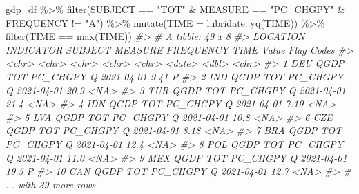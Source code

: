 \documentclass[
]{article}
\newenvironment{Shaded}{\begin{snugshade}}{\end{snugshade}}
\newcommand{\AttributeTok}[1]{\textcolor[rgb]{0.77,0.63,0.00}{#1}}
\newcommand{\CommentTok}[1]{\textcolor[rgb]{0.56,0.35,0.01}{\textit{#1}}}
\newcommand{\FunctionTok}[1]{\textcolor[rgb]{0.00,0.00,0.00}{#1}}
\newcommand{\NormalTok}[1]{#1}
\newcommand{\SpecialCharTok}[1]{\textcolor[rgb]{0.00,0.00,0.00}{#1}}
\newcommand{\StringTok}[1]{\textcolor[rgb]{0.31,0.60,0.02}{#1}}
\begin{document}
\begin{Shaded}
\begin{Highlighting}[]
\NormalTok{gdp\_df }\SpecialCharTok{\%\textgreater{}\%} 
  \FunctionTok{filter}\NormalTok{(SUBJECT }\SpecialCharTok{==} \StringTok{"TOT"} \SpecialCharTok{\&}\NormalTok{ MEASURE }\SpecialCharTok{==} \StringTok{"PC\_CHGPY"} \SpecialCharTok{\&}\NormalTok{ FREQUENCY }\SpecialCharTok{!=} \StringTok{"A"}\NormalTok{) }\SpecialCharTok{\%\textgreater{}\%} 
  \FunctionTok{mutate}\NormalTok{(}\AttributeTok{TIME =}\NormalTok{ lubridate}\SpecialCharTok{::}\FunctionTok{yq}\NormalTok{(TIME)) }\SpecialCharTok{\%\textgreater{}\%} 
  \FunctionTok{filter}\NormalTok{(TIME }\SpecialCharTok{==} \FunctionTok{max}\NormalTok{(TIME)) }
\CommentTok{\#\textgreater{} \# A tibble: 49 x 8}
\CommentTok{\#\textgreater{}    LOCATION INDICATOR SUBJECT MEASURE  FREQUENCY TIME       Value \textasciigrave{}Flag Codes\textasciigrave{}}
\CommentTok{\#\textgreater{}    \textless{}chr\textgreater{}    \textless{}chr\textgreater{}     \textless{}chr\textgreater{}   \textless{}chr\textgreater{}    \textless{}chr\textgreater{}     \textless{}date\textgreater{}     \textless{}dbl\textgreater{} \textless{}chr\textgreater{}       }
\CommentTok{\#\textgreater{}  1 DEU      QGDP      TOT     PC\_CHGPY Q         2021{-}04{-}01  9.41 P           }
\CommentTok{\#\textgreater{}  2 IND      QGDP      TOT     PC\_CHGPY Q         2021{-}04{-}01 20.9  \textless{}NA\textgreater{}        }
\CommentTok{\#\textgreater{}  3 TUR      QGDP      TOT     PC\_CHGPY Q         2021{-}04{-}01 21.4  \textless{}NA\textgreater{}        }
\CommentTok{\#\textgreater{}  4 IDN      QGDP      TOT     PC\_CHGPY Q         2021{-}04{-}01  7.19 \textless{}NA\textgreater{}        }
\CommentTok{\#\textgreater{}  5 LVA      QGDP      TOT     PC\_CHGPY Q         2021{-}04{-}01 10.8  \textless{}NA\textgreater{}        }
\CommentTok{\#\textgreater{}  6 CZE      QGDP      TOT     PC\_CHGPY Q         2021{-}04{-}01  8.18 \textless{}NA\textgreater{}        }
\CommentTok{\#\textgreater{}  7 BRA      QGDP      TOT     PC\_CHGPY Q         2021{-}04{-}01 12.4  \textless{}NA\textgreater{}        }
\CommentTok{\#\textgreater{}  8 POL      QGDP      TOT     PC\_CHGPY Q         2021{-}04{-}01 11.0  \textless{}NA\textgreater{}        }
\CommentTok{\#\textgreater{}  9 MEX      QGDP      TOT     PC\_CHGPY Q         2021{-}04{-}01 19.5  P           }
\CommentTok{\#\textgreater{} 10 CAN      QGDP      TOT     PC\_CHGPY Q         2021{-}04{-}01 12.7  \textless{}NA\textgreater{}        }
\CommentTok{\#\textgreater{} \# ... with 39 more rows}
\end{Highlighting}
\end{Shaded}
\end{document}
